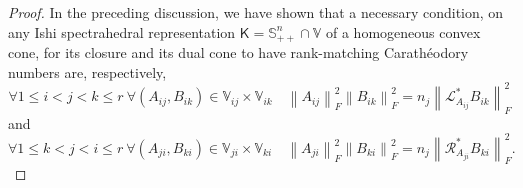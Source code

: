 \documentclass[oneside]{amsart}
\theoremstyle{plain}
\theoremstyle{definition}
\theoremstyle{remark}
\numberwithin{equation}{section}
\begin{document}
\begin{proof}
In the preceding discussion, we have shown that a necessary condition, on
any Ishi spectrahedral representation $\mathsf{K} = \mathbb{S}^{n}_{++}
\cap \mathbb{V}$ of a homogeneous convex cone, for its closure and its dual
cone to have rank-matching Carath\'eodory numbers are, respectively,
\[
\forall 1 \leq i < j < k \leq r \ \forall (A_{ij}, B_{ik}) \in
\mathbb{V}_{ij} \times \mathbb{V}_{ik} \quad \left\lVert
A_{ij}\right\rVert_{F}^{2} \left\lVert B_{ik}\right\rVert_{F}^{2} = n_{j}
\left\lVert \mathcal{L}^{*}_{A_{ij}} B_{ik}\right\rVert_{F}^{2}
\]
and
\[
\forall 1 \leq k < j < i \leq r \ \forall (A_{ji}, B_{ki}) \in
\mathbb{V}_{ji} \times \mathbb{V}_{ki} \quad \left\lVert
A_{ji}\right\rVert_{F}^{2} \left\lVert B_{ki}\right\rVert_{F}^{2} = n_{j}
\left\lVert \mathcal{R}^{*}_{A_{ji}} B_{ki}\right\rVert_{F}^{2}.
\]


\end{proof}
\end{document}
